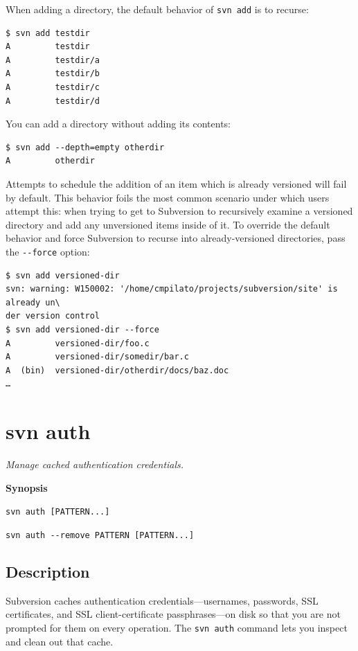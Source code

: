 When adding a directory, the default behavior of \texttt{svn\ add} is to
recurse:

\begin{verbatim}
$ svn add testdir
A         testdir
A         testdir/a
A         testdir/b
A         testdir/c
A         testdir/d
\end{verbatim}

You can add a directory without adding its contents:

\begin{verbatim}
$ svn add --depth=empty otherdir
A         otherdir
\end{verbatim}

Attempts to schedule the addition of an item which is already versioned
will fail by default. This behavior foils the most common scenario under
which users attempt this: when trying to get to Subversion to
recursively examine a versioned directory and add any unversioned items
inside of it. To override the default behavior and force Subversion to
recurse into already-versioned directories, pass the \texttt{-\/-force}
option:

\begin{verbatim}
$ svn add versioned-dir
svn: warning: W150002: '/home/cmpilato/projects/subversion/site' is already un\
der version control
$ svn add versioned-dir --force
A         versioned-dir/foo.c
A         versioned-dir/somedir/bar.c
A  (bin)  versioned-dir/otherdir/docs/baz.doc
…
\end{verbatim}

\section{svn auth}\label{svn.ref.svn.c.auth}

\emph{Manage cached authentication credentials.}

\textbf{Synopsis}

\texttt{svn\ auth\ {[}PATTERN...{]}}

\texttt{svn\ auth\ -\/-remove\ PATTERN\ {[}PATTERN...{]}}

\subsection{Description}

Subversion caches authentication credentials---usernames, passwords, SSL
certificates, and SSL client-certificate passphrases---on disk so that
you are not prompted for them on every operation. The \texttt{svn\ auth}
command lets you inspect and clean out that cache.

